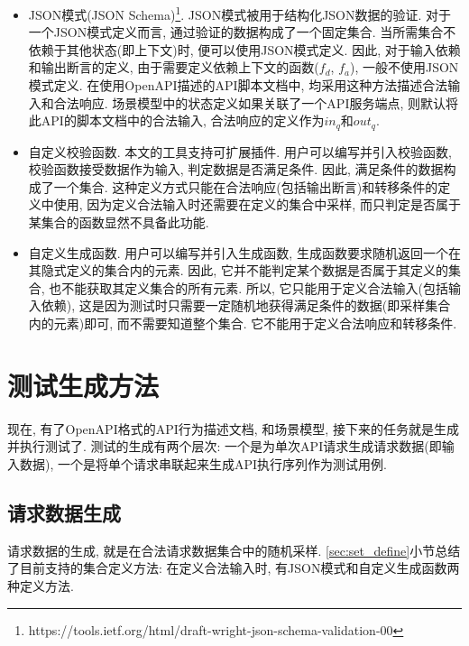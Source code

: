             \label{sec:set_define}
            \begin{itemize}
                \item JSON模式(JSON Schema)\footnote{https://tools.ietf.org/html/draft-wright-json-schema-validation-00}. JSON模式被用于结构化JSON数据的验证. 对于一个JSON模式定义而言, 通过验证的数据构成了一个固定集合. 当所需集合不依赖于其他状态(即上下文)时, 便可以使用JSON模式定义. 因此, 对于输入依赖和输出断言的定义, 由于需要定义依赖上下文的函数($f_d$, $f_a$), 一般不使用JSON模式定义. 在使用OpenAPI描述的API脚本文档中, 均采用这种方法描述合法输入和合法响应. 场景模型中的状态定义如果关联了一个API服务端点, 则默认将此API的脚本文档中的合法输入, 合法响应的定义作为$in_q$和$out_q$.
                
                \item 自定义校验函数. 本文的工具支持可扩展插件. 用户可以编写并引入校验函数, 校验函数接受数据作为输入, 判定数据是否满足条件. 因此, 满足条件的数据构成了一个集合. 这种定义方式只能在合法响应(包括输出断言)和转移条件的定义中使用, 因为定义合法输入时还需要在定义的集合中采样, 而只判定是否属于某集合的函数显然不具备此功能.
                
                \item 自定义生成函数. 用户可以编写并引入生成函数, 生成函数要求随机返回一个在其隐式定义的集合内的元素. 因此, 它并不能判定某个数据是否属于其定义的集合, 也不能获取其定义集合的所有元素. 所以, 它只能用于定义合法输入(包括输入依赖), 这是因为测试时只需要一定随机地获得满足条件的数据(即采样集合内的元素)即可, 而不需要知道整个集合. 它不能用于定义合法响应和转移条件.
            \end{itemize}
            
    
    \section{测试生成方法}
        现在, 有了OpenAPI格式的API行为描述文档, 和场景模型, 接下来的任务就是生成并执行测试了. 测试的生成有两个层次: 一个是为单次API请求生成请求数据(即输入数据), 一个是将单个请求串联起来生成API执行序列作为测试用例.
        
        \subsection{请求数据生成}
            请求数据的生成, 就是在合法请求数据集合中的随机采样. \ref{sec:set_define}小节总结了目前支持的集合定义方法: 在定义合法输入时, 有JSON模式和自定义生成函数两种定义方法.
            
